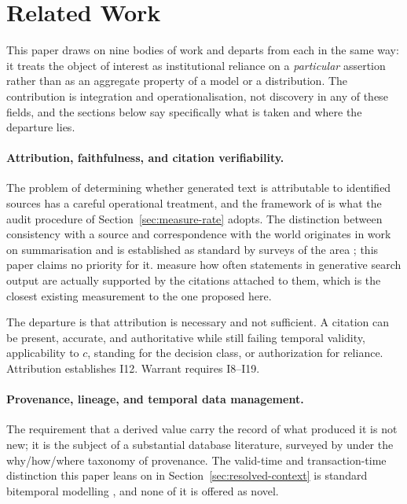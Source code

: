 \section{Related Work}
\label{sec:related}

This paper draws on nine bodies of work and departs from each in the same way: it
treats the object of interest as institutional reliance on a \emph{particular}
assertion rather than as an aggregate property of a model or a distribution. The
contribution is integration and operationalisation, not discovery in any of these
fields, and the sections below say specifically what is taken and where the departure
lies.

\paragraph{Attribution, faithfulness, and citation verifiability.} The problem of
determining whether generated text is attributable to identified sources has a
careful operational treatment, and the framework of \citet{rashkin2023} is what the
audit procedure of Section~\ref{sec:measure-rate} adopts. The distinction between
consistency with a source and correspondence with the world originates in work on
summarisation \citep{maynez2020} and is established as standard by surveys of the area
\citep{ji2023}; this paper claims no priority for it. \citet{liu2023} measure how
often statements in generative search output are actually supported by the citations
attached to them, which is the closest existing measurement to the one proposed here.

The departure is that attribution is necessary and not sufficient. A citation can be
present, accurate, and authoritative while still failing temporal validity,
applicability to $c$, standing for the decision class, or authorization for reliance.
Attribution establishes I12. Warrant requires I8--I19.

\paragraph{Provenance, lineage, and temporal data management.} The requirement that a
derived value carry the record of what produced it is not new; it is the subject of a
substantial database literature, surveyed by \citet{cheney2009} under the
why/how/where taxonomy of provenance. The valid-time and transaction-time distinction
this paper leans on in Section~\ref{sec:resolved-context} is standard bitemporal
modelling \citep{snodgrass1999}, and none of it is offered as novel.

